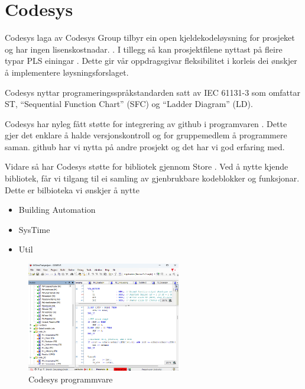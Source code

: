 \section{Codesys}
\thispagestyle{fancy}
\gls{Codesys} laga av \gls{Codesys} Group tilbyr ein open kjeldekodeløysning for prosjeket og har ingen lisenskostnadar. \citep{CodesysLisens}. 
I tillegg så kan prosjektfilene nyttast på fleire typar PLS einingar \citep{CodesysPLS}. 
Dette gir vår oppdragsgivar fleksibilitet i korleis dei ønskjer å implementere løysningsforslaget.

\gls{Codesys} nyttar programeringsspråkstandarden satt av \gls{IEC} 61131-3 som omfattar \gls{ST}, ``Sequential Function Chart'' (\gls{SFC}) og ``Ladder Diagram'' (\gls{LD}). 

\gls{Codesys} har nyleg fått støtte for integrering av \gls{github} i programvaren \citep{CodesysGIT}. 
Dette gjer det enklare å halde versjonskontroll og for gruppemedlem å programmere saman. 
\gls{github} har vi nytta på andre prosjekt og det har vi god erfaring med.

Vidare så har \gls{Codesys} støtte for bibliotek gjennom  Store \citep{CodesysStore}. 
Ved å nytte kjende bibliotek, får vi tilgang til ei samling av gjenbrukbare kodeblokker og funksjonar.
Dette er bilbioteka vi ønskjer å nytte

 
\begin{itemize}
    \item {} Building Automation \citep{BuildingAutomation}
    \item SysTime \citep{DateAndTime}
    \item Util \citep{Util} \newline \newline
\end{itemize} 

\begin{figure}[htbp]
    \centering
    \includegraphics[width=0.6\textwidth]{Bilder/Codesys.png}
    \caption{Codesys programmvare}\label{fig:Codesys}
\end{figure}

\newpage
